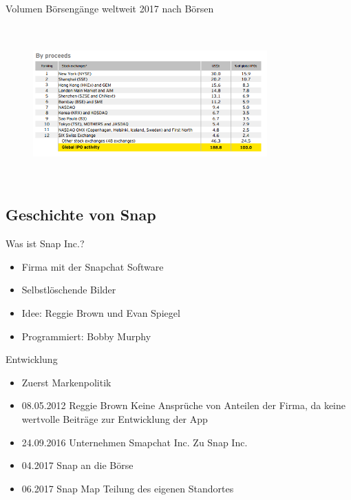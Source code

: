 \documentclass{beamer}
\begin{document}
\begin{frame} {Volumen Börsengänge weltweit 2017 nach Börsen}
\begin{figure}
	\centering
	\includegraphics[width=9cm, height=6cm]{IPOsExchangeProceeds.PNG}
\end{figure}
\end{frame}





\subsection{Geschichte von Snap}
\begin{frame} {Was ist Snap Inc.?}
\begin{itemize}
\item Firma mit der Snapchat Software 
\item  Selbstlöschende Bilder
\item  Idee: Reggie Brown und Evan Spiegel
\item  Programmiert: Bobby Murphy
\end{itemize}
\end{frame}

\begin{frame} {Entwicklung}
\begin{itemize}
	\item Zuerst Markenpolitik \pause
	\item  08.05.2012 Reggie Brown Keine Ansprüche von Anteilen der Firma, da keine wertvolle Beiträge zur Entwicklung der App \pause
	\item  24.09.2016 Unternehmen Smapchat Inc. Zu Snap Inc. \pause
	\item  04.2017 Snap an die Börse \pause
	\item 06.2017 Snap Map Teilung des eigenen Standortes \pause
	
\end{itemize}
\end{frame}
\end{document}
